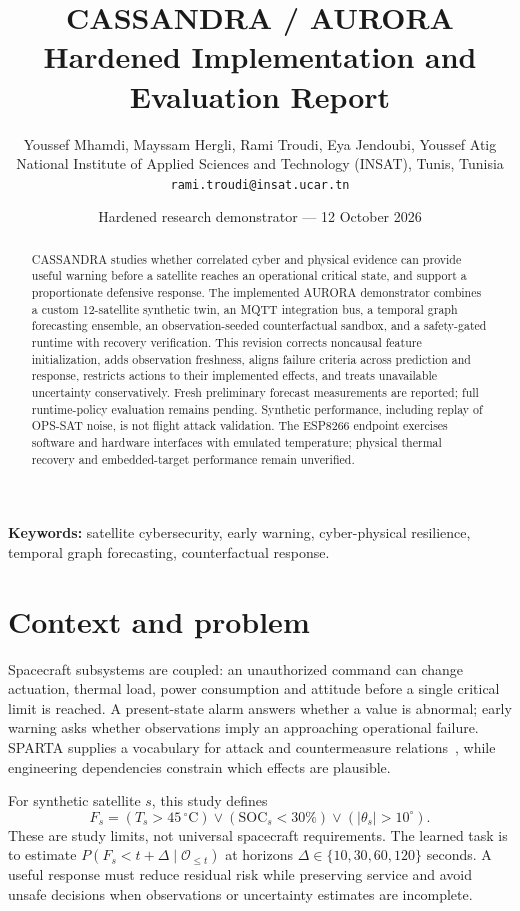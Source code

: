 \documentclass[10pt,a4paper,twocolumn]{article}
\title{\color{navy}CASSANDRA / AURORA\\Hardened Implementation and Evaluation Report}
\author{\small Youssef Mhamdi, Mayssam Hergli, Rami Troudi, Eya Jendoubi, Youssef Atig\\
\small National Institute of Applied Sciences and Technology (INSAT), Tunis, Tunisia\\
\small\texttt{rami.troudi@insat.ucar.tn}}
\date{Hardened research demonstrator --- 12 October 2026}
\begin{document}
\maketitle
\begin{abstract}
CASSANDRA studies whether correlated cyber and physical evidence can provide useful warning before a satellite reaches an operational critical state, and support a proportionate defensive response. The implemented AURORA demonstrator combines a custom 12-satellite synthetic twin, an MQTT integration bus, a temporal graph forecasting ensemble, an observation-seeded counterfactual sandbox, and a safety-gated runtime with recovery verification. This revision corrects noncausal feature initialization, adds observation freshness, aligns failure criteria across prediction and response, restricts actions to their implemented effects, and treats unavailable uncertainty conservatively. Fresh preliminary forecast measurements are reported; full runtime-policy evaluation remains pending. Synthetic performance, including replay of OPS-SAT noise, is not flight attack validation. The ESP8266 endpoint exercises software and hardware interfaces with emulated temperature; physical thermal recovery and embedded-target performance remain unverified.
\end{abstract}
\noindent\textbf{Keywords:} satellite cybersecurity, early warning, cyber-physical resilience, temporal graph forecasting, counterfactual response.

\section{Context and problem}
Spacecraft subsystems are coupled: an unauthorized command can change actuation, thermal load, power consumption and attitude before a single critical limit is reached. A present-state alarm answers whether a value is abnormal; early warning asks whether observations imply an approaching operational failure. SPARTA supplies a vocabulary for attack and countermeasure relations~\cite{sparta}, while engineering dependencies constrain which effects are plausible.

For synthetic satellite $s$, this study defines
\begin{equation}
 F_s = (T_s>45\,^{\circ}\mathrm{C})\lor(\mathrm{SOC}_s<30\%)\lor(|\theta_s|>10^{\circ}).
\end{equation}
These are study limits, not universal spacecraft requirements. The learned task is to estimate $P(F_s<t+\Delta\mid\mathcal O_{\leq t})$ at horizons $\Delta\in\{10,30,60,120\}$ seconds. A useful response must reduce residual risk while preserving service and avoid unsafe decisions when observations or uncertainty estimates are incomplete.
\end{document}

